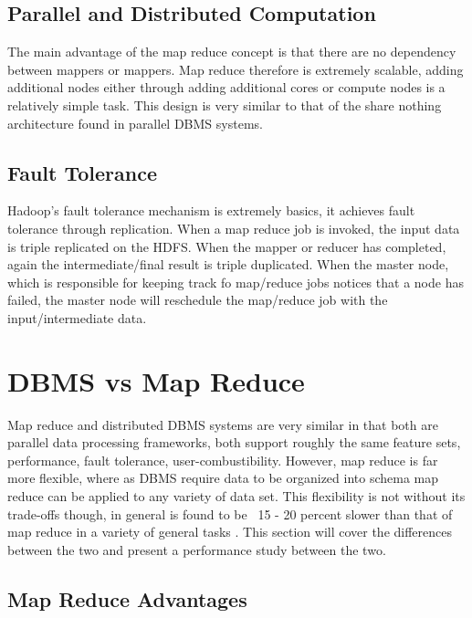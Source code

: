 \documentclass[10pt,twocolumn]{IEEEtran11}
\begin{document}
\subsection{Parallel and Distributed Computation}

The main advantage of the map reduce concept is that there are no dependency between mappers or mappers.  Map reduce therefore is extremely scalable, adding additional nodes either through adding additional cores or compute nodes is a relatively simple task.  This design is very similar to that of the share nothing architecture found in parallel DBMS systems.

\subsection{Fault Tolerance}

Hadoop's fault tolerance mechanism is extremely basics, it achieves fault tolerance through replication.  When a map reduce job is invoked, the input data is triple replicated on the HDFS.  When the mapper or reducer has completed, again the intermediate/final result is triple duplicated.  When the master node, which is responsible for keeping track fo map/reduce jobs notices that a node has failed, the master node will reschedule the map/reduce job with the input/intermediate data.


\section{DBMS vs Map Reduce}
Map reduce and distributed DBMS systems are very similar in that both are parallel data processing frameworks, both support roughly the same feature sets, performance, fault tolerance, user-combustibility.  However, map reduce is far more flexible,  where  as DBMS require data to be organized into schema map reduce can be applied to any variety of data set.  This flexibility is not without its trade-offs though, in general is found to be ~15 - 20 percent slower than that of map reduce in a variety of general tasks \cite{pavlo2009comparison}.  This section will cover the differences between the two and present a performance study between the two.

\subsection{Map Reduce Advantages}
\end{document}
